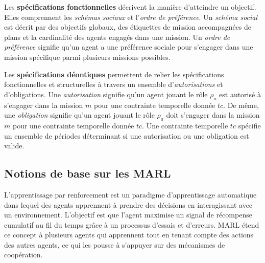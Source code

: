 Les \textbf{spécifications fonctionnelles} décrivent la manière d'atteindre un objectif. Elles comprennent les \emph{schémas sociaux} et l'\emph{ordre de préférence}. Un \emph{schéma social} est décrit par des objectifs globaux, des étiquettes de mission accompagnées de plans et la cardinalité des agents engagés dans une mission. Un \emph{ordre de préférence} signifie qu'un agent a une préférence sociale pour s'engager dans une mission spécifique parmi plusieurs missions possibles.

Les \textbf{spécifications déontiques} permettent de relier les spécifications fonctionnelles et structurelles à travers un ensemble d'\emph{autorisations} et d'obligations. Une \emph{autorisation} signifie qu'un agent jouant le rôle $\rho_a$ est autorisé à s'engager dans la mission $m$ pour une contrainte temporelle donnée $tc$. De même, une \emph{obligation} signifie qu'un agent jouant le rôle $\rho_a$ doit s'engager dans la mission $m$ pour une contrainte temporelle donnée $tc$. Une contrainte temporelle $tc $ spécifie un ensemble de périodes déterminant si une autorisation ou une obligation est valide.


\subsection{Notions de base sur les MARL}

L'apprentissage par renforcement est un paradigme d'apprentissage automatique dans lequel des agents apprennent à prendre des décisions en interagissant avec un environnement. L'objectif est que l'agent maximise un signal de récompense cumulatif au fil du temps grâce à un processus d'essais et d'erreurs.
MARL étend ce concept à plusieurs agents qui apprennent tout en tenant compte des actions des autres agents, ce qui les pousse à s'appuyer sur des mécanismes de coopération.

